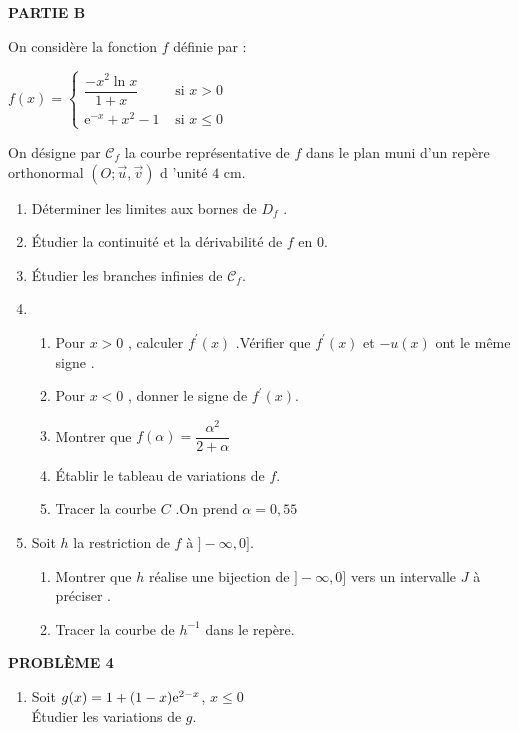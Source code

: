 \begin{enumerate}
 
 \textbf{PARTIE B}
 
  On considère  la fonction $ f $ définie par :\medskip
  
   $f(x)=\begin{cases}  
\dfrac{-x^{2}\ln x}{1 +x} & \text{ si } x > 0 \\[0.25cm]
\text{e}^{-x}  + x^{2}- 1  & \text{ si }  x \leq 0  
\end{cases} $ 


 On désigne par $\mathscr{C}_{f}$ la courbe représentative de $ f $ dans le plan muni d'un repère orthonormal $(O ;\overrightarrow{u},\overrightarrow{v})$ d 'unité $ 4  $ cm.
 
 \begin{enumerate}
 \item Déterminer les limites aux bornes de $ D_{f}$ .
 \item  Étudier la continuité et la dérivabilité de $ f $ en $ 0 $.
 \item Étudier les branches infinies de $\mathscr{C}_{f}$.
 \item 
 \begin{enumerate}
 \item Pour $ x > 0 $ , calculer $ f^{'}(x)  $ .Vérifier que $ f^{'}(x) $ et $- u(x) $ ont le même signe .
 \item Pour $ x < 0 $ , donner le signe de  $ f^{'}(x) $.
 \item Montrer que $ f(\alpha)=\dfrac{\alpha^{2}}{2+\alpha} $ 
 \item Établir le tableau de variations de  $ f $.
 \item Tracer la courbe $ C $ .On prend $ \alpha = 0,55 $ 
 \end{enumerate}
 \item Soit $ h $ la restriction de $ f $ à $ ]-\infty , 0] $.
 \begin{enumerate}
 \item Montrer que $ h $ réalise une bijection de $ ]-\infty , 0] $ vers un intervalle $ J $ à préciser .
 \item Tracer la courbe de  $ h^{-1 } $ dans le repère.
 \end{enumerate}
 \end{enumerate}

\vspace{0,5cm}

\textbf{PROBLÈME 4}

\vspace{0,2cm}

\begin{enumerate}
\item Soit $ g(x)=1+(1-x)\mathrm{e}^{2-x} $,\; $ x\leq0 $\\ Étudier les variations de $ g $. 


\end{enumerate}
\end{enumerate}
